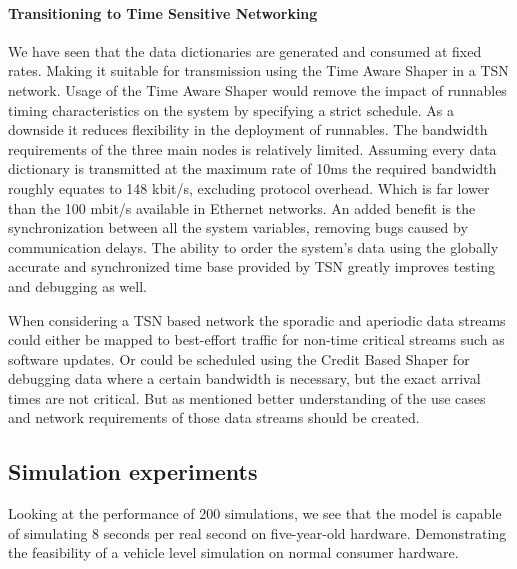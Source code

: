 \paragraph{Transitioning to Time Sensitive Networking}
We have seen that the data dictionaries are generated and consumed at fixed rates. Making it suitable for transmission using the Time Aware Shaper in a TSN network. Usage of the Time Aware Shaper would remove the impact of runnables timing characteristics on the system by specifying a strict schedule. As a downside it reduces flexibility in the deployment of runnables. The bandwidth requirements of the three main nodes is relatively limited. Assuming every data dictionary is transmitted at the maximum rate of 10ms the required bandwidth roughly equates to 148 kbit/s, excluding protocol overhead. Which is far lower than the 100 mbit/s available in Ethernet networks. An added benefit is the synchronization between all the system variables, removing bugs caused by communication delays. The ability to order the system's data using the globally accurate and synchronized time base provided by TSN greatly improves testing and debugging as well. 

When considering a TSN based network the sporadic and aperiodic data streams could either be mapped to best-effort traffic for non-time critical streams such as software updates. Or could be scheduled using the Credit Based Shaper for debugging data where a certain bandwidth is necessary, but the exact arrival times are not critical. But as mentioned better understanding of the use cases and network requirements of those data streams should be created.

\subsection{Simulation experiments}
Looking at the performance of 200 simulations, we see that the model is capable of simulating 8 seconds per real second on five-year-old hardware. Demonstrating the feasibility of a vehicle level simulation on normal consumer hardware.

